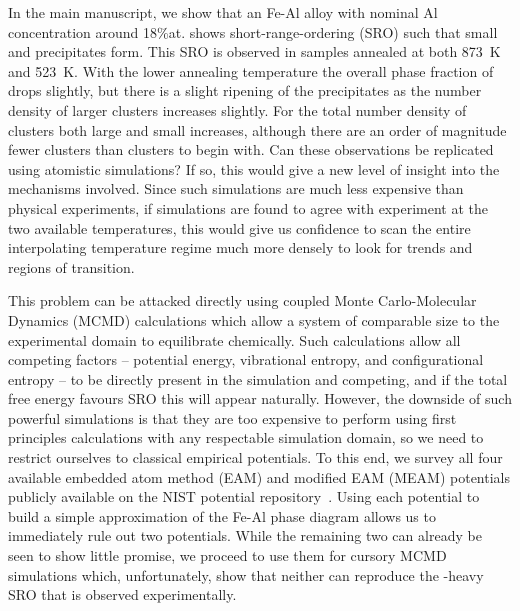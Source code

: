In the main manuscript, we show that an Fe-Al alloy with nominal Al concentration around 18\%at. shows short-range-ordering (SRO) such that small \DOTHREE and \BTWO precipitates form.
This SRO is observed in samples annealed at both 873~K and 523~K.
With the lower annealing temperature the overall phase fraction of \DOTHREE drops slightly, but there is a slight ripening of the precipitates as the number density of larger clusters increases slightly.
For \BTWO the total number density of clusters both large and small increases, although there are an order of magnitude fewer \BTWO clusters than \DOTHREE clusters to begin with.
Can these observations be replicated using atomistic simulations?
If so, this would give a new level of insight into the mechanisms involved.
Since such simulations are much less expensive than physical experiments, if simulations are found to agree with experiment at the two available temperatures, this would give us confidence to scan the entire interpolating temperature regime much more densely to look for trends and regions of transition.

This problem can be attacked directly using coupled Monte Carlo-Molecular Dynamics (MCMD) calculations which allow a system of comparable size to the experimental domain to equilibrate chemically.
Such calculations allow all competing factors -- potential energy, vibrational entropy, and configurational entropy -- to be directly present in the simulation and competing, and if the total free energy favours SRO this will appear naturally.
However, the downside of such powerful simulations is that they are too expensive to perform using first principles calculations with any respectable simulation domain, so we need to restrict ourselves to classical empirical potentials.
To this end, we survey all four available embedded atom method (EAM) and modified EAM (MEAM) potentials publicly available on the NIST potential repository~\cite{nist}.
Using each potential to build a simple approximation of the Fe-Al phase diagram allows us to immediately rule out two potentials.
While the remaining two can already be seen to show little promise, we proceed to use them for cursory MCMD simulations which, unfortunately, show that neither can reproduce the \DOTHREE-heavy SRO that is observed experimentally.
